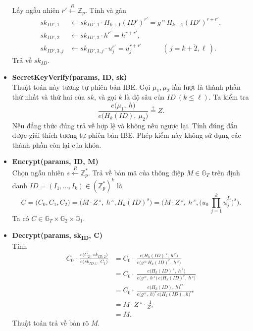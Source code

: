 \documentclass[class=report, crop=false]{standalone}
\begin{document}
\begin{itemize}[leftmargin=1cm, itemindent=-1cm]
			Lấy ngẫu nhiên $r' \xleftarrow{R} \mathbb{Z}_p$. Tính và gán
			\begin{align*}
				sk_{ID', 1} &\leftarrow
					sk_{ID', 1} \cdot H_{k + 1}(ID')^{r'} =
					g\,^\alpha\, H_{k + 1}(ID')^{r + r'}, \\
				sk_{ID', 2} &\leftarrow sk_{ID', 2} \cdot h^{r'} = h^{r + r'}, \\
				sk_{ID', 3, j} &\leftarrow sk_{ID', 3, j} \cdot u_j^{r'} = u_j^{r + r'} \quad\quad\quad (\, j = \overline{k + 2, \ell}\,).
			\end{align*}
			Trả về $sk_{ID}$.
			\item[] {\sffamily\bfseries SecretKeyVerify(params, ID, sk)} \\
			Thuật toán này tương tự phiên bản IBE. Gọi $\mu_1, \mu_2$ lần lượt là thành phần thứ nhất và thứ hai của $sk$, và gọi $k$ là độ sâu của $ID \ (k \leq \ell)$. Ta kiểm tra
			\[
				\frac{e \Big(\mu_1,\ h \Big)}{e \Big(H_{k}(ID),\ \mu_2 \Big)} \overset{?}{=} Z.
			\]
			Nếu đẳng thức đúng trả về hợp lệ và không nếu ngược lại. Tính đúng đắn được giải thích tương tự phiên bản IBE. Phép kiểm này không sử dụng các thành phần còn lại của khóa.
			\item[] {\sffamily\bfseries Encrypt(params, ID, M)} \\
			Chọn ngẫu nhiên $s \xleftarrow{R} \mathbb{Z}_p^*$. Trả về bản mã của thông điệp $M \in \mathbb{G}_T$ trên định danh $ID = (I_1, \dots, I_k) \in (\mathbb{Z}_p^*)^k$ là
			\[
				C = \Big(C_0, C_1, C_2 \Big) = \Big(M \cdot Z\,^s,\ h\,^s, H_{k}(ID)^s \Big) = \Big(M \cdot Z\,^s,\ h\,^s, \Big(u_0 \, \prod_{j = 1}^k u_j^{I_j} \Big)^s \Big).
			\]
			Ta có $C \in \mathbb{G}_T \times \mathbb{G}_2 \times \mathbb{G}_1$.
			\item[] {\sffamily\bfseries Decrypt(params, sk\textsubscript{ID}, C)} \\
			Tính
			\begin{align*}
				C_0 \cdot\ \frac{e \Big(C_2,\ sk_{ID, 2} \Big)}{e \Big(sk_{ID, 1},\ C_1 \Big)} &=
				C_0 \cdot\ \frac{e \Big(H_{k}(ID)\,^s,\ h\,^r \Big)}{e \Big(g\,^\alpha\, H_{k}(ID)^r,\ h\,^s \Big)} \\ &=
				C_0 \cdot\ \frac{e \Big(H_{k}(ID)\,^s,\ h\,^r \Big)}{e \Big(g\,^\alpha,\ h\,^s \Big)\, e \Big(H_{k}(ID)^r,\ h\,^s \Big)} \\ &=
				C_0 \cdot\ \frac{e \Big(H_{k}(ID),\ h \Big)^{rs}}{e \Big(g\,^\alpha,\ h \Big)^s\, e \Big(H_{k}(ID),\ h \Big)^{rs}} \\ &=
				M \cdot Z\,^s \cdot \frac{1}{Z\,^s} \\
				&= M.
			\end{align*}
			Thuật toán trả về bản rõ $M$.
		\end{itemize}
		
\end{document}
